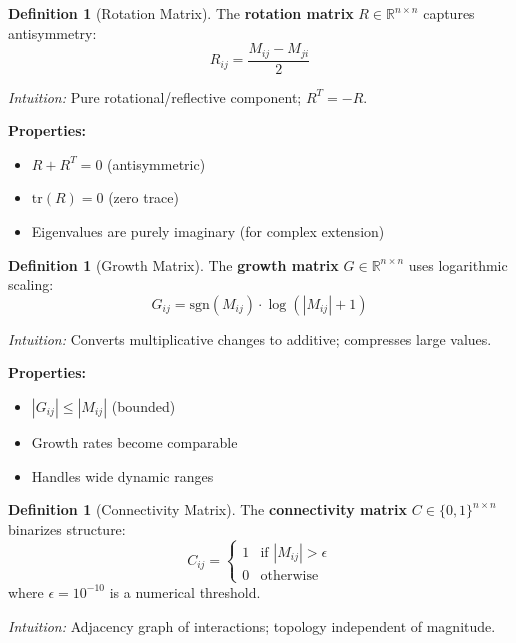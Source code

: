 \documentclass[11pt,a4paper]{article}
\theoremstyle{definition}
\newtheorem{definition}[theorem]{Definition}
\theoremstyle{remark}
\newcommand{\R}{\mathbb{R}}
\newcommand{\abs}[1]{\left|#1\right|}
\newcommand{\trace}{\text{tr}}
\newcommand{\sgn}{\text{sgn}}
\begin{document}
\begin{definition}[Rotation Matrix]\label{def:rotation}
The \textbf{rotation matrix} $R \in \R^{n \times n}$ captures antisymmetry:
\begin{equation}
R_{ij} = \frac{M_{ij} - M_{ji}}{2}
\end{equation}
\end{definition}

\textit{Intuition:} Pure rotational/reflective component; $R^T = -R$.

\textbf{Properties:}
\begin{itemize}
\item $R + R^T = 0$ (antisymmetric)
\item $\trace(R) = 0$ (zero trace)
\item Eigenvalues are purely imaginary (for complex extension)
\end{itemize}

\begin{definition}[Growth Matrix]\label{def:growth}
The \textbf{growth matrix} $G \in \R^{n \times n}$ uses logarithmic scaling:
\begin{equation}
G_{ij} = \sgn(M_{ij}) \cdot \log(\abs{M_{ij}} + 1)
\end{equation}
\end{definition}

\textit{Intuition:} Converts multiplicative changes to additive; compresses large values.

\textbf{Properties:}
\begin{itemize}
\item $\abs{G_{ij}} \leq \abs{M_{ij}}$ (bounded)
\item Growth rates become comparable
\item Handles wide dynamic ranges
\end{itemize}

\begin{definition}[Connectivity Matrix]\label{def:connectivity}
The \textbf{connectivity matrix} $C \in \{0,1\}^{n \times n}$ binarizes structure:
\begin{equation}
C_{ij} = \begin{cases}
1 & \text{if } \abs{M_{ij}} > \epsilon \\
0 & \text{otherwise}
\end{cases}
\end{equation}
where $\epsilon = 10^{-10}$ is a numerical threshold.
\end{definition}

\textit{Intuition:} Adjacency graph of interactions; topology independent of magnitude.
\end{document}

